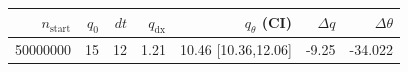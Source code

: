\begin{tabular}{r r r r r r r}
\hline
$n_{\mathrm{start}}$ & $q_0$ & $dt$ & $q_{\mathrm{dx}}$ & $q_{\theta}$ (CI) & $\Delta q$ & $\Delta\theta$ \\
\hline
50000000 & 15 & 12 & 1.21 & 10.46 [10.36,12.06] & -9.25 & -34.022 \\
\hline
\end{tabular}
